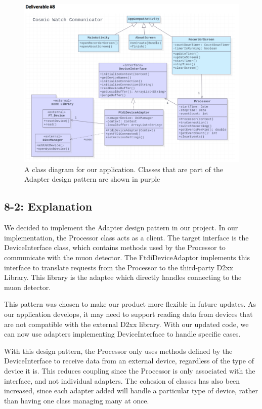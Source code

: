 \documentclass[11pt,a4paper]{article}
\begin{document}
\begin{figure}[h] \centering
	\includegraphics[width=1.2\textwidth]{classdiagramD8.png}
	\caption{A class diagram for our application. Classes that are part of the Adapter design pattern are shown in purple}
\end{figure}


\subsection*{8-2: Explanation}


We decided to implement the Adapter design pattern in our project. In our implementation, the Processor class acts as a client. The target interface is the DeviceInterface class, which contains methods used by the Processor to communicate with the muon detector. The FtdiDeviceAdaptor implements this interface to translate requests from the Processor to the third-party D2xx Library. This library is the adaptee which directly handles connecting to the muon detector.

This pattern was chosen to make our product more flexible in future updates. As our application develops, it may need to support reading data from devices that are not compatible with the external D2xx library. With our updated code, we can now use adapters implementing DeviceInterface to handle specific cases.

With this design pattern, the Processor only uses methods defined by the DeviceInterface to receive data from an external device, regardless of the type of device it is. This reduces coupling since the Processor is only associated with the interface, and not individual adapters. The cohesion of classes has also been increased, since each adapter added will handle a particular type of device, rather than having one class managing many at once.
\end{document}
